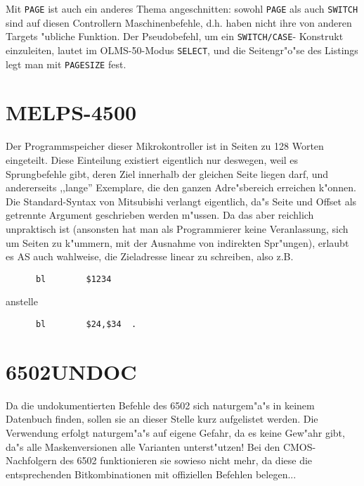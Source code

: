 \documentclass[12pt,a4paper,twoside]{report}
\newcommand{\tty}[1]{{\tt #1}}
\begin{document}
Mit \tty{PAGE} ist auch ein anderes Thema angeschnitten: sowohl
\tty{PAGE} als auch \tty{SWITCH} sind auf diesen Controllern
Maschinenbefehle, d.h. haben nicht ihre von anderen Targets
"ubliche Funktion.  Der Pseudobefehl, um ein \tty{SWITCH/CASE}-
Konstrukt einzuleiten, lautet im OLMS-50-Modus \tty{SELECT}, und
die Seitengr"o"se des Listings legt man mit \tty{PAGESIZE} fest.


\section{MELPS-4500}

Der Programmspeicher dieser Mikrokontroller ist in Seiten zu
128 Worten eingeteilt.  Diese Einteilung existiert eigentlich nur
deswegen, weil es Sprungbefehle gibt, deren Ziel innerhalb der
gleichen Seite liegen darf, und andererseits ,,lange'' Exemplare,
die den ganzen Adre"sbereich erreichen k"onnen.  Die Standard-Syntax
von Mitsubishi verlangt eigentlich, da"s Seite und Offset als getrennte
Argument geschrieben werden m"ussen.  Da das aber reichlich unpraktisch
ist (ansonsten hat man als Programmierer keine Veranlassung, sich um
Seiten zu k"ummern, mit der Ausnahme von indirekten Spr"ungen), erlaubt
es AS auch wahlweise, die Zieladresse linear zu schreiben, also z.B.
\begin{verbatim}
      bl        $1234
\end{verbatim}
anstelle
\begin{verbatim}
      bl        $24,$34  .
\end{verbatim}


\section{6502UNDOC}

Da die undokumentierten Befehle des 6502 sich naturgem"a"s in keinem
Datenbuch finden, sollen sie an dieser Stelle kurz aufgelistet werden.
Die Verwendung erfolgt naturgem"a"s auf eigene Gefahr, da es keine
Gew"ahr gibt, da"s alle Maskenversionen alle Varianten unterst"utzen!
Bei den CMOS-Nachfolgern des 6502 funktionieren sie sowieso nicht
mehr, da diese die entsprechenden Bitkombinationen mit offiziellen Befehlen
belegen...

\clearpage
\end{document}
